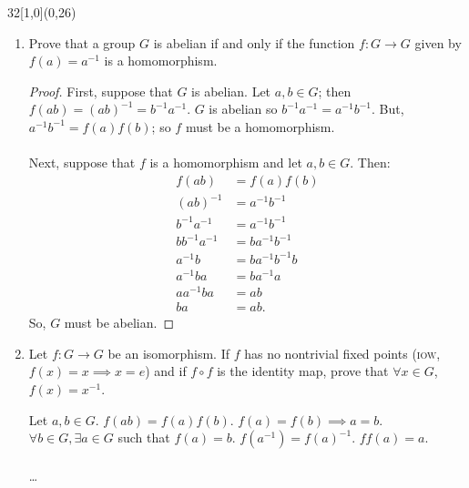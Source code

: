 \documentclass[12pt]{article}
\newenvironment{exercise}[2]{\begin{textblock}{32}[1,0](0,#2)\noindent#1\end{textblock}}{\vspace{1in}}
\begin{document}
\begin{exercise}{1.50}{26}
	\quad
	\begin{enumerate}[(i.)]
		\item Prove that a group $G$ is abelian if and only if the function $f:G\to G$ given by $f(a)=a^{-1}$ is a homomorphism.
		\bigskip
		\begin{proof}
			First, suppose that $G$ is abelian. Let $a,b\in G$; then $f(ab)=(ab)^{-1}=b^{-1}a^{-1}$. $G$ is abelian so $b^{-1}a^{-1}=a^{-1}b^{-1}$. But, $a^{-1}b^{-1}=f(a)f(b)$; so $f$ must be a homomorphism.\\
			\\
			Next, suppose that $f$ is a homomorphism and let $a,b\in G$. Then:
			\begin{align*}
				f(ab)&=f(a)f(b)\\
				(ab)^{-1}&=a^{-1}b^{-1}\\
				b^{-1}a^{-1}&=a^{-1}b^{-1}\\
				bb^{-1}a^{-1}&=ba^{-1}b^{-1}\\
				a^{-1}b&=ba^{-1}b^{-1}b\\
				a^{-1}ba&=ba^{-1}a\\
				aa^{-1}ba&=ab\\
				ba&=ab.
			\end{align*}
			So, $G$ must be abelian.
		\end{proof}

		\item Let $f:G\to G$ be an isomorphism. If $f$ has no nontrivial fixed points (\textsc{iow}, $f(x)=x\implies x=e$) and if $f\circ f$ is the identity map, prove that $\forall x\in G$, $f(x)=x^{-1}$.
		\bigskip

		Let $a,b\in G$. $f(ab)=f(a)f(b)$. $f(a)=f(b)\implies a=b$. $\forall b\in G, \exists a\in G$ such that $f(a)=b$. $f(a^{-1})=f(a)^{-1}$. $ff(a)=a$.\\
		\\
		\dots
	\end{enumerate}
\end{exercise}
\end{document}
